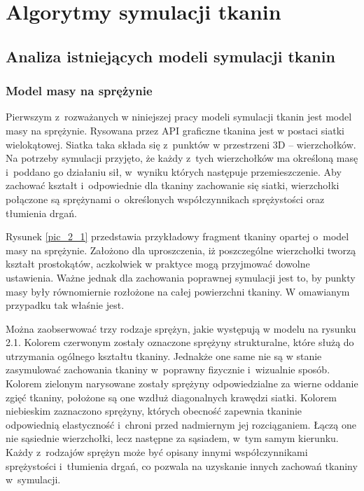 \chapter{Algorytmy symulacji tkanin}
\label{t:teoria}


	\section{Analiza istniejących modeli symulacji tkanin}
	\label{t:teoria:analiza}
	
		\subsection{Model masy na sprężynie}
		\label{t:teoria:analiza:masa}		
			
			Pierwszym z~rozważanych w niniejszej pracy modeli symulacji tkanin jest model masy na sprężynie. Rysowana przez API graficzne tkanina jest w postaci siatki wielokątowej. Siatka taka składa się z~punktów w przestrzeni 3D -- wierzchołków. Na potrzeby symulacji przyjęto, że każdy z~tych wierzchołków ma określoną masę i~poddano go działaniu sił, w~wyniku których następuje przemieszczenie. Aby zachować kształt i~odpowiednie dla tkaniny zachowanie się siatki, wierzchołki połączone są sprężynami o~określonych współczynnikach sprężystości oraz tłumienia drgań. 
			
			
			
			
			Rysunek \ref{pic_2_1} przedstawia przykładowy fragment tkaniny opartej o~model masy na sprężynie. Założono dla uproszczenia, iż poszczególne wierzchołki tworzą kształt prostokątów, aczkolwiek w praktyce mogą przyjmować dowolne ustawienia. Ważne jednak dla zachowania poprawnej symulacji jest to, by punkty masy były równomiernie rozłożone na całej powierzchni tkaniny. W omawianym przypadku tak właśnie jest. 
			
			Można zaobserwować trzy rodzaje sprężyn, jakie występują w modelu na rysunku 2.1. Kolorem czerwonym zostały oznaczone sprężyny strukturalne, które służą do utrzymania ogólnego kształtu tkaniny. Jednakże one same nie są w stanie zasymulować zachowania tkaniny w~poprawny fizycznie i~wizualnie sposób. Kolorem zielonym narysowane zostały sprężyny odpowiedzialne za wierne oddanie zgięć tkaniny, położone są one wzdłuż diagonalnych krawędzi siatki. Kolorem niebieskim zaznaczono sprężyny, których obecność zapewnia tkaninie odpowiednią elastyczność i~chroni przed nadmiernym jej rozciąganiem. Łączą one nie sąsiednie wierzchołki, lecz następne za sąsiadem, w~tym samym kierunku. Każdy z~rodzajów sprężyn może być opisany innymi współczynnikami sprężystości i~tłumienia drgań, co pozwala na uzyskanie innych zachowań tkaniny w~symulacji.
			
